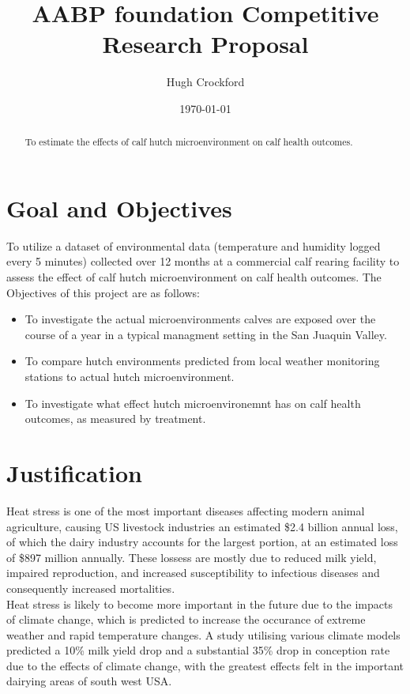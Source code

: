 \documentclass[12pt]{article}
\title{AABP foundation Competitive Research Proposal}
\author{Hugh Crockford}
\date{\today}
\begin{document}
	\maketitle
	\tableofcontents
	
	\newpage
	\begin{abstract}
		To estimate the effects of calf hutch microenvironment on calf health outcomes.
	\end{abstract}
	\section{Goal and Objectives}
	To utilize a dataset of environmental data (temperature and humidity logged every 5 minutes) collected over 12 months at a commercial calf rearing facility to assess the effect of calf hutch microenvironment on calf health outcomes.
	The Objectives of this project are as follows:
	\begin{itemize}
		\item To investigate the actual microenvironments calves are exposed over the course of a year in a typical managment setting in the San Juaquin Valley.
		\item To compare hutch environments predicted from local weather monitoring stations to actual hutch microenvironment.
		\item To investigate what effect hutch microenvironemnt has on calf health outcomes, as measured by treatment.
	\end{itemize}


	\newpage
	\section{Justification}
	Heat stress is one of the most important diseases affecting modern animal agriculture, causing US livestock industries an estimated \$2.4 billion annual loss, of which the dairy industry accounts for the largest portion, at an estimated loss of \$897 million annually\cite{St-Pierre2003}. 
	These lossess are mostly due to reduced milk yield, impaired reproduction, and increased susceptibility to infectious diseases and consequently increased mortalities.\cite{Kadzere2002,Hammami2013}\\
	Heat stress is likely to become more important in the future due to the impacts of climate change, which is predicted to increase the occurance of extreme weather and rapid temperature changes\cite{Parry2007}. A study utilising various climate models predicted a 10\% milk yield drop and a substantial 35\% drop in conception rate due to the effects of climate change, with the greatest effects felt in the important dairying areas of south west USA\cite{Klinedinst1993}.
\end{document}
